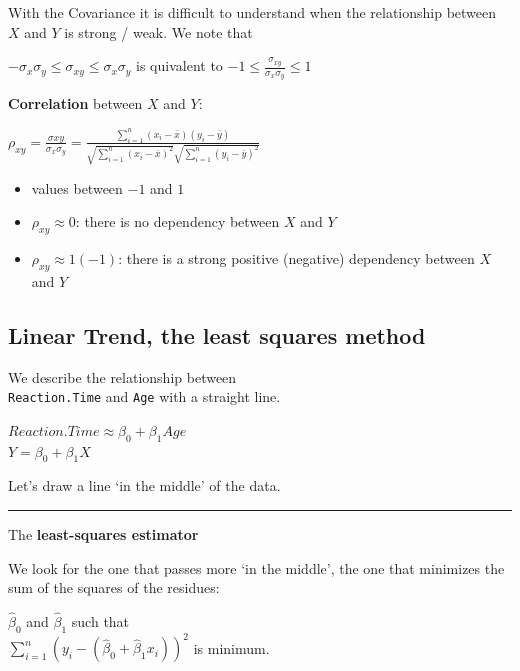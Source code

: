 \documentclass[]{article}
\providecommand{\tightlist}{%
  \setlength{\itemsep}{0pt}\setlength{\parskip}{0pt}}
\begin{document}
With the Covariance it is difficult to understand when the relationship
between \(X\) and \(Y\) is strong / weak. We note that

\(- \sigma_{x} \sigma_{y} \leq \sigma_{xy} \leq \sigma_{x} \sigma_{y}\)
is quivalent to
\(-1 \leq \frac{\sigma_{xy}}{\sigma_{x} \sigma_{y}} \leq 1\)

\textbf{Correlation} between \(X\) and \(Y\):

\(\rho_{xy}=\frac{\sigma{xy}}{\sigma_{x} \sigma_{y}} = \frac{\sum_{i=1} ^ n (x_i- \bar{x}) (y_i- \bar{y})}{\sqrt{\sum_{i=1} ^ n (x_i- \bar{ x}) ^ 2} \sqrt{\sum_{i=1} ^ n (y_i- \bar{y}) ^ 2}}\)

\begin{itemize}
\tightlist
\item
  values between \(-1\) and \(1\)
\item
  \(\rho_{xy} \approx 0\): there is no dependency between \(X\) and
  \(Y\)
\item
  \(\rho_{xy} \approx 1 (-1)\): there is a strong positive (negative)
  dependency between \(X\) and \(Y\)
\end{itemize}

\hypertarget{linear-trend-the-least-squares-method}{%
\subsection{Linear Trend, the least squares
method}\label{linear-trend-the-least-squares-method}}

We describe the relationship between\\
\texttt{Reaction.Time} and \texttt{Age} with a straight line.

\(Reaction.Time \approx \beta_0 + \beta_1 Age\)\\
\(Y=\beta_0 + \beta_1X\)

Let's draw a line `in the middle' of the data.

\begin{center}\rule{0.5\linewidth}{\linethickness}\end{center}

The \textbf{least-squares estimator}

We look for the one that passes more `in the middle', the one that
minimizes the sum of the squares of the residues:

\(\hat{\beta}_0\) and \(\hat{\beta}_1\) such that\\
\(\sum_{i=1} ^ n (y_i - (\hat{\beta}_0 + \hat{\beta}_1x_i )) ^ 2\) is
minimum.
\end{document}
